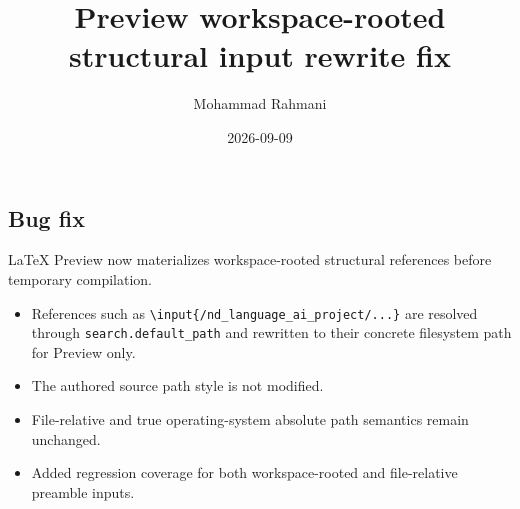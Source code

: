 \documentclass[a4paper]{article}
\title{Preview workspace-rooted structural input rewrite fix}
\date{2026-09-09}
\author{Mohammad Rahmani}
\begin{document}
   \maketitle

   \begin{preview}
      \section*{Bug fix}
      LaTeX Preview now materializes workspace-rooted structural references before
      temporary compilation.

      \begin{itemize}
         \item References such as
         \texttt{\textbackslash input\{/nd\_language\_ai\_project/...\}}
         are resolved through \texttt{search.default\_path} and rewritten to their
         concrete filesystem path for Preview only.
         \item The authored source path style is not modified.
         \item File-relative and true operating-system absolute path semantics remain
         unchanged.
         \item Added regression coverage for both workspace-rooted and file-relative
         preamble inputs.
      \end{itemize}
   \end{preview}

   
   
\end{document}
